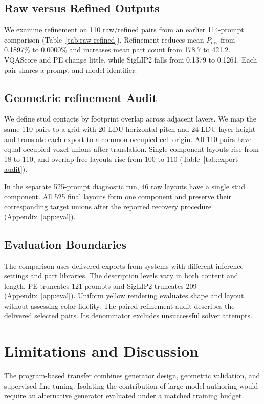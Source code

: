 \documentclass[letterpaper]{article} %
\begin{document}
\subsection{Raw versus Refined Outputs}

We examine refinement on 110 raw/refined pairs from an earlier 114-prompt comparison (Table~\ref{tab:raw-refined}). Refinement reduces mean $P_{\mathrm{inv}}$ from 0.1897\% to 0.0000\% and increases mean part count from 178.7 to 421.2. VQAScore and PE change little, while SigLIP2 falls from 0.1379 to 0.1261. Each pair shares a prompt and model identifier.

\subsection{Geometric refinement Audit}
\label{sec:diagnostics}
We define stud contacts by footprint overlap across adjacent layers. We map the same 110 pairs to a grid with 20 LDU horizontal pitch and 24 LDU layer height and translate each export to a common occupied-cell origin. All 110 pairs have equal occupied voxel unions after translation. Single-component layouts rise from 18 to 110, and overlap-free layouts rise from 100 to 110 (Table~\ref{tab:export-audit}).


In the separate 525-prompt diagnostic run, 46 raw layouts have a single stud component. All 525 final layouts form one component and preserve their corresponding target unions after the reported recovery procedure (Appendix~\ref{app:eval}).

\subsection{Evaluation Boundaries}
The comparison uses delivered exports from systems with different inference settings and part libraries. The description levels vary in both content and length. PE truncates 121 prompts and SigLIP2 truncates 209 (Appendix~\ref{app:eval}). Uniform yellow rendering evaluates shape and layout without assessing color fidelity. The paired refinement audit describes the delivered selected pairs. Its denominator excludes unsuccessful solver attempts.


\section{Limitations and Discussion}
The program-based transfer combines generator design, geometric validation, and supervised fine-tuning. Isolating the contribution of large-model authoring would require an alternative generator evaluated under a matched training budget.
\end{document}
